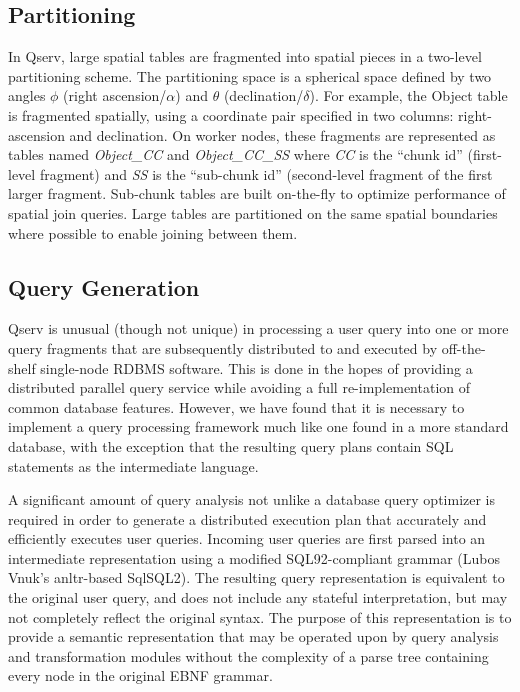 \documentclass[DM,toc]{lsstdoc}
\begin{document}
\subsection{Partitioning}\label{partitioning-1}

In Qserv, large spatial tables are fragmented into spatial pieces in a two-level
partitioning scheme. The partitioning space is a spherical space defined
by two angles $\phi$ (right ascension/$\alpha$) and $\theta$
(declination/$\delta$). For example, the Object table is fragmented spatially,
using a coordinate pair specified in two columns: right-ascension and
declination. On worker nodes, these fragments are represented as tables named
\emph{Object\_CC} and \emph{Object\_CC\_SS} where \emph{CC} is the ``chunk
id'' (first-level fragment) and \emph{SS} is the ``sub-chunk id'' (second-level
fragment of the first larger fragment. Sub-chunk tables are built on-the-fly
to optimize performance of spatial join queries. Large tables are
partitioned on the same spatial boundaries where possible to enable joining
between them.

\subsection{Query Generation}\label{query-generation}

Qserv is unusual (though not unique) in processing a user query into one or
more query fragments that are subsequently distributed to and executed by
off-the-shelf single-node RDBMS software. This is done in the hopes of
providing a distributed parallel query service while avoiding a full re-implementation
of common database features. However, we have found that it is
necessary to implement a query processing framework much like one found in a
more standard database, with the exception that the resulting query plans
contain SQL statements as the intermediate language.

A significant amount of query analysis not unlike a database query optimizer
is required in order to generate a distributed execution plan that accurately
and efficiently executes user queries. Incoming user queries are first parsed
into an intermediate representation using a modified SQL92-compliant grammar
(Lubos Vnuk's anltr-based SqlSQL2). The resulting query representation is
equivalent to the original user query, and does not include any stateful
interpretation, but may not completely reflect the original syntax. The
purpose of this representation is to provide a semantic representation that
may be operated upon by query analysis and transformation modules without the
complexity of a parse tree containing every node in the original EBNF grammar.
\end{document}
